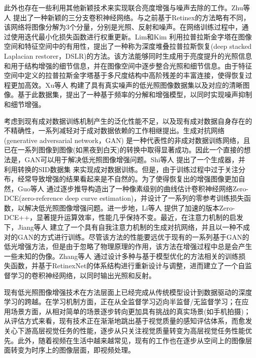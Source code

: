 此外也存在一些利用其他新颖技术来实现联合亮度增强与噪声去除的工作。Zhu等人 \cite{DBLP:conf/aaai/ZhuPCY20}提出了一种新颖的三分支卷积神经网络。与之前基于Retinex的方法略有不同，该网络将图像分解为3个分量，分别是光照、反射和噪声。在网络训练过程中，通过使用迭代最小化损失函数进行权重更新。Lim和Kim \cite{DBLP:journals/tmm/Lim021}利用拉普拉斯金字塔在图像空间和特征空间中的有用性，提出了一种称为深度堆叠拉普拉斯恢复(deep stacked Laplacian restorer，DSLR)的方法。该方法能够同时生成用于亮度提升的光照信息和用于结构增强的细节信息，并在图像空间中逐步整合光照和细节信息。由于特征空间中定义的拉普拉斯金字塔基于多尺度结构中高阶残差的丰富连接，使得恢复过程更加高效。Xu等人 \cite{DBLP:conf/cvpr/0010YYL20}构建了具有真实噪声的低光照图像数据集以及对应的清晰图像。基于此数据集，提出了一种基于频率的分解和增强模型，以同时实现噪声抑制和细节增强。

考虑到现有成对数据训练机制产生的泛化性能不足，以及现有成对数据自身存在的不精确性，一系列减轻对于成对数据依赖的工作相继提出。生成对抗网络(generative adversarial network，GAN) \cite{DBLP:conf/nips/LiuBK17}是一种代表性的非成对数据训练网络，且已在一系列图像到图像(如黑夜到白天)的转换中取得显著成功。因此一个直接的想法是，GAN可以用于解决低光照图像增强问题。Shi等人 \cite{DBLP:journals/corr/abs-1906-06027}提出了一个生成器，并利用转换的SID数据集 \cite{DBLP:conf/cvpr/ChenCXK18}来实现成对数据训练。但是，由于训练过程中过于关注分布，经常导致增强的结果看起来是不自然的。为了使得恢复出的增强图像更加自然，Guo等人 \cite{DBLP:conf/cvpr/GuoLGLHKC20}通过逐步推导构造出了一种像素级别的曲线估计卷积神经网络Zero-DCE(zero-reference deep curve estimation)，并设计了一系列的零参考训练损失函数，以解决低光照图像增强问题。进一步地，Li等人 \cite{DBLP:journals/pami/LiGL22}提供了加速的版本Zero-DCE++，显著提升运算效率，性能几乎保持不变。最近，在注意力机制的启发下，Jiang等人 \cite{DBLP:journals/tip/JiangGLCFSYZW21}建立了一个具有自我注意力机制的生成对抗网络，并且以一种不成对的GAN的方式进行训练。尽管该方法的性能要远优于现有的一系列基于GAN的低光增强方法，但是由于忽略了物理原理的作用，该方法在增强过程中总是会产生一些未知的伪像。Zhang等人 \cite{DBLP:journals/corr/abs-2002-11300}通过设计多种与基于模型优化的方法相关的训练损失函数，并基于RetinexNet的体系结构进行重新设计与调整，进而建立了一个自监督学习的卷积神经网络，以同时输出光照和反射。

现有低光照图像增强技术在方法层面上已经完成从传统模型设计到数据驱动的深度学习的跨越。在学习机制方面，正在从全监督学习迈向半监督/无监督学习；在应用场景方面，从相对简单的场景逐步转向更加具有挑战的真实场景(如手机拍摄)；从评估方式来看，现有技术正在渐渐地跳出基于视觉质量的感知评估体系，而愈发关心下游高层视觉任务的性能，逐步从只关注视觉质量转变为高层视觉任务性能优先。此外，随着视频在生活中越来越常见，现有的工作也在逐步从空间上的图像层面转变为时序上的图像层面，即视频处理。
